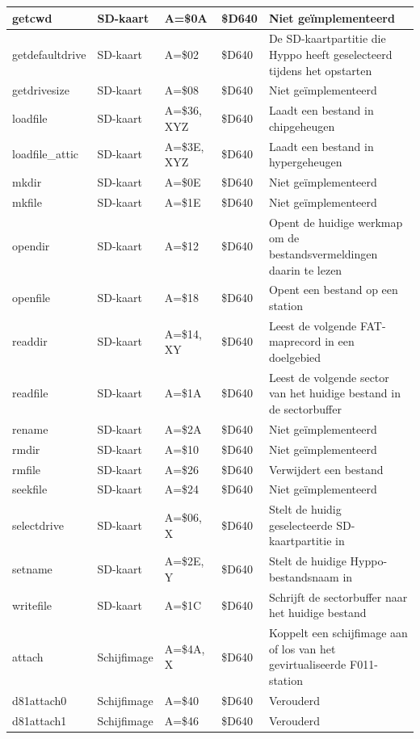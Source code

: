 \begin{longtable}{|L{4cm}|p{2cm}|L{1.5cm}|L{1.2cm}|L{4.3cm}|}
\hline
getcwd & SD-kaart & A=\$0A & \$D640 & Niet geïmplementeerd \\
\hline
getdefaultdrive & SD-kaart & A=\$02 & \$D640 & De SD-kaartpartitie die Hyppo heeft geselecteerd tijdens het opstarten \\
\hline
getdrivesize & SD-kaart & A=\$08 & \$D640 & Niet geïmplementeerd \\
\hline
loadfile & SD-kaart & A=\$36, XYZ & \$D640 & Laadt een bestand in chipgeheugen \\
\hline
loadfile\_attic & SD-kaart & A=\$3E, XYZ & \$D640 & Laadt een bestand in hypergeheugen \\
\hline
mkdir & SD-kaart & A=\$0E & \$D640 & Niet geïmplementeerd \\
\hline
mkfile & SD-kaart & A=\$1E & \$D640 & Niet geïmplementeerd \\
\hline
opendir & SD-kaart & A=\$12 & \$D640 & Opent de huidige werkmap om de bestandsvermeldingen daarin te lezen \\
\hline
openfile & SD-kaart & A=\$18 & \$D640 & Opent een bestand op een station \\
\hline
readdir & SD-kaart & A=\$14, XY & \$D640 & Leest de volgende FAT-maprecord in een doelgebied \\
\hline
readfile & SD-kaart & A=\$1A & \$D640 & Leest de volgende sector van het huidige bestand in de sectorbuffer \\
\hline
rename & SD-kaart & A=\$2A & \$D640 & Niet geïmplementeerd \\
\hline
rmdir & SD-kaart & A=\$10 & \$D640 & Niet geïmplementeerd \\
\hline
rmfile & SD-kaart & A=\$26 & \$D640 & Verwijdert een bestand \\
\hline
seekfile & SD-kaart & A=\$24 & \$D640 & Niet geïmplementeerd \\
\hline
selectdrive & SD-kaart & A=\$06, X & \$D640 & Stelt de huidig geselecteerde SD-kaartpartitie in \\
\hline
setname & SD-kaart & A=\$2E, Y & \$D640 & Stelt de huidige Hyppo-bestandsnaam in \\
\hline
writefile & SD-kaart & A=\$1C & \$D640 & Schrijft de sectorbuffer naar het huidige bestand \\
\hline
attach & Schijfimage & A=\$4A, X & \$D640 & Koppelt een schijfimage aan of los van het gevirtualiseerde F011-station \\
\hline
d81attach0 & Schijfimage & A=\$40 & \$D640 & Verouderd \\
\hline
d81attach1 & Schijfimage & A=\$46 & \$D640 & Verouderd \\

\end{longtable}
